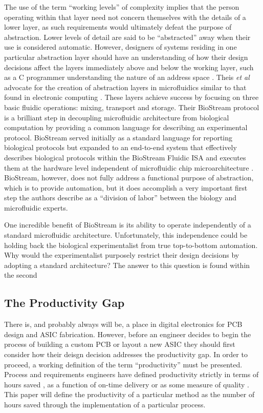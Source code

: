 \documentclass[11pt,journal,compsoc, onecolumn]{IEEEtran}
\begin{document}
The use of the term ``working levels'' of complexity implies that the person
operating within that layer need not concern themselves with the details of
a lower layer, as such requirements would ultimately defeat the purpose of
abstraction. Lower levels of detail are said to be ``abstracted'' away when
their use is considered automatic. However, designers of systems residing in one particular
abstraction layer should have an understanding of how their design decisions
affect the layers immediately above and below the working layer, such as a C
programmer understanding the nature of an address space
\cite{Harris+Harris}. Theis \emph{et al} advocate for the creation of abstraction layers
in microfluidics similar to that found in electronic computing
\cite{thies2008}. These layers achieve success by focusing on three basic fluidic operations:
mixing, transport and storage. Their BioStream protocol is a brilliant step in
decoupling microfluidic architecture from biological computation by
providing a common language for describing an experimental protocol. BioStream
served initially as a standard language for reporting biological protocols but
expanded to an end-to-end system that effectively
describes biological protocols within the BioStream Fluidic ISA and executes
them at the hardware level independent of microfluidic chip microarchitecture
\cite{thies2008}. BioStream, however, does not fully address a functional purpose of
abstraction, which is to provide automation, but it does accomplish a very
important first step the authors describe as a ``division of labor'' between
the biology and microfluidic experts. 

One incredible benefit of BioStream is its ability to operate independently of
a standard microfluidic architecture. Unfortunately, this independence could be
holding back the biological experimentalist from true top-to-bottom automation.
Why would the experimentalist purposely restrict their design decisions by
adopting a standard architecture? The answer to this question is found within
the second 

\subsection{The Productivity Gap}

There is, and probably always will be, a place in digital electronics for PCB
design and ASIC fabrication. However, before an engineer decides to begin
the process of building a custom PCB or layout a new ASIC they should first
consider how their deisgn decision addresses the productivity gap. In order to proceed,
a working definition of the term ``productivity'' must be presented. Process
and requirements engineers \cite{Review_ProcessEngr} have defined productivity
strictly in terms of hours saved \cite{CostBenefit_hours}, as a function of
on-time delivery \cite{OnTimeDelivery} or as some measure of quality
\cite{Quality}. This paper will define the productivity of a particular method
as the number of hours saved through the implementation of a particular
process.
\end{document}
